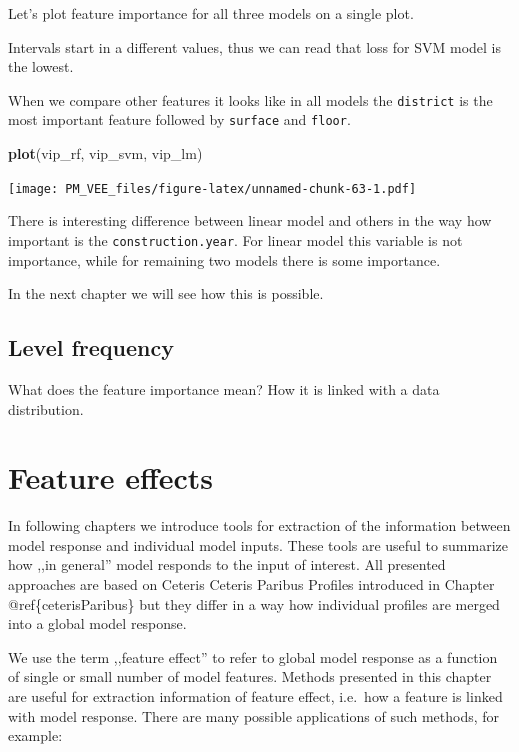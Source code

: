 \documentclass[12pt,]{krantz}
\newenvironment{Shaded}{\begin{snugshade}}{\end{snugshade}}
\newcommand{\KeywordTok}[1]{\textcolor[rgb]{0.13,0.29,0.53}{\textbf{#1}}}
\newcommand{\NormalTok}[1]{#1}
\theoremstyle{definition}
\theoremstyle{definition}
\theoremstyle{definition}
\theoremstyle{remark}
\begin{document}
Let's plot feature importance for all three models on a single plot.

Intervals start in a different values, thus we can read that loss for
SVM model is the lowest.

When we compare other features it looks like in all models the
\texttt{district} is the most important feature followed by
\texttt{surface} and \texttt{floor}.

\begin{Shaded}
\begin{Highlighting}[]
\KeywordTok{plot}\NormalTok{(vip_rf, vip_svm, vip_lm)}
\end{Highlighting}
\end{Shaded}

\texttt{[image: PM\_VEE\_files/figure-latex/unnamed-chunk-63-1.pdf]}

There is interesting difference between linear model and others in the
way how important is the \texttt{construction.year}. For linear model
this variable is not importance, while for remaining two models there is
some importance.

In the next chapter we will see how this is possible.

\hypertarget{level-frequency}{%
\subsection{Level frequency}\label{level-frequency}}

What does the feature importance mean? How it is linked with a data
distribution.

\hypertarget{featureEffects}{%
\section{Feature effects}\label{featureEffects}}

In following chapters we introduce tools for extraction of the
information between model response and individual model inputs. These
tools are useful to summarize how ,,in general'' model responds to the
input of interest. All presented approaches are based on Ceteris Ceteris
Paribus Profiles introduced in Chapter @ref\{ceterisParibus\} but they
differ in a way how individual profiles are merged into a global model
response.

We use the term ,,feature effect'' to refer to global model response as
a function of single or small number of model features. Methods
presented in this chapter are useful for extraction information of
feature effect, i.e.~how a feature is linked with model response. There
are many possible applications of such methods, for example:
\end{document}

